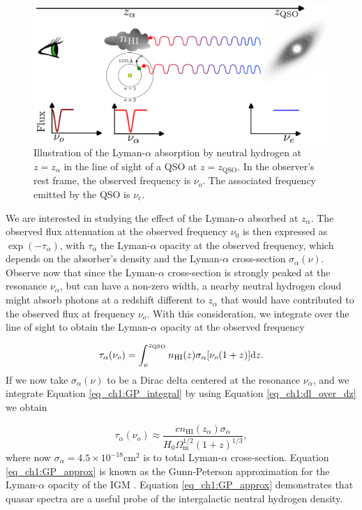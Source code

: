 \begin{figure}[t]
    \centering
    \includegraphics[width=1\linewidth]{img/lyman-alpha.pdf}
    \caption{Illustration of the Lyman-$\alpha$ absorption by neutral hydrogen at $z=z_\alpha$ in the line of sight of a QSO at $z=z_{\text{QSO}}$. In the observer's rest frame, the observed frequency is $\nu_o$. The associated frequency emitted by the QSO is $\nu_e$. }
    \label{fig_ch1:Lyman_alpha_diagram}
\end{figure}
We are interested in studying the effect of the Lyman-$\alpha$ absorbed at $z_\alpha$. The observed flux attenuation at the observed frequency $\nu_0$ is then expressed as $\exp(-\tau_\alpha)$, with $\tau_\alpha$ the Lyman-$\alpha$ opacity at the observed frequency, which depends on the absorber's density and the Lyman-$\alpha$ cross-section $\sigma_\alpha(\nu)$. Observe now that since the Lyman-$\alpha$ cross-section is strongly peaked at the resonance $\nu_\alpha$, but can have a non-zero width, a nearby neutral hydrogen cloud might absorb photons at a redshift different to $z_\alpha$ that would have contributed to the observed flux at frequency $\nu_o$. With this consideration, we integrate over the line of sight to obtain the Lyman-$\alpha$ opacity at the observed frequency

\begin{equation}\label{eq_ch1:GP_integral}
    \tau_\alpha(\nu_o)=\int_o^{z_\text{QSO}} n_\text{HI}(z) \sigma_\alpha[\nu_o(1+z)] \differential z.
\end{equation}
If we now take $\sigma_\alpha(\nu)$ to be a Dirac delta centered at the resonance $\nu_\alpha$, and we integrate Equation \ref{eq_ch1:GP_integral} by using Equation \ref{eq_ch1:dl_over_dz} we obtain

\begin{equation}\label{eq_ch1:GP_approx}
    \tau_\alpha(\nu_o)\approx \frac{cn_\text{HI}(z_\alpha)\sigma_\alpha}{H_0\Omega_\text{m}^{1/2} (1+z)^{1/3}},
\end{equation}
where now $\sigma_\alpha=4.5 \times 10^{-18}$cm$^2$ is to total Lyman-$\alpha$ cross-section.
Equation \ref{eq_ch1:GP_approx} is known as the Gunn-Peterson approximation for the Lyman-$\alpha$ opacity of the IGM \cite{GunnPeterson}. Equation \ref{eq_ch1:GP_approx} demonstrates that quasar spectra are a useful probe of the intergalactic neutral hydrogen density.





